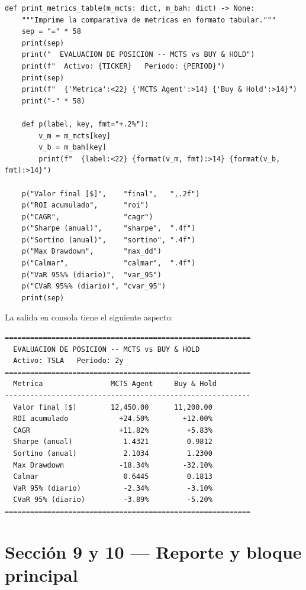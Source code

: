 \documentclass[12pt, a4paper]{article}
\begin{document}
\begin{lstlisting}[caption={Funcion \texttt{print\_metrics\_table()}}]
def print_metrics_table(m_mcts: dict, m_bah: dict) -> None:
    """Imprime la comparativa de metricas en formato tabular."""
    sep = "=" * 58
    print(sep)
    print("  EVALUACION DE POSICION -- MCTS vs BUY & HOLD")
    print(f"  Activo: {TICKER}   Periodo: {PERIOD}")
    print(sep)
    print(f"  {'Metrica':<22} {'MCTS Agent':>14} {'Buy & Hold':>14}")
    print("-" * 58)

    def p(label, key, fmt="+.2%"):
        v_m = m_mcts[key]
        v_b = m_bah[key]
        print(f"  {label:<22} {format(v_m, fmt):>14} {format(v_b, fmt):>14}")

    p("Valor final [$]",    "final",   ",.2f")
    p("ROI acumulado",      "roi")
    p("CAGR",               "cagr")
    p("Sharpe (anual)",     "sharpe",  ".4f")
    p("Sortino (anual)",    "sortino", ".4f")
    p("Max Drawdown",       "max_dd")
    p("Calmar",             "calmar",  ".4f")
    p("VaR 95%% (diario)",  "var_95")
    p("CVaR 95%% (diario)", "cvar_95")
    print(sep)
\end{lstlisting}

La salida en consola tiene el siguiente aspecto:

\begin{verbatim}
==========================================================
  EVALUACION DE POSICION -- MCTS vs BUY & HOLD
  Activo: TSLA   Periodo: 2y
==========================================================
  Metrica                MCTS Agent     Buy & Hold
----------------------------------------------------------
  Valor final [$]        12,450.00      11,200.00
  ROI acumulado            +24.50%        +12.00%
  CAGR                     +11.82%         +5.83%
  Sharpe (anual)            1.4321         0.9812
  Sortino (anual)           2.1034         1.2300
  Max Drawdown             -18.34%        -32.10%
  Calmar                    0.6445         0.1813
  VaR 95% (diario)          -2.34%         -3.10%
  CVaR 95% (diario)         -3.89%         -5.20%
==========================================================
\end{verbatim}

\section{Sección 9 y 10 --- Reporte y bloque principal}
\end{document}

